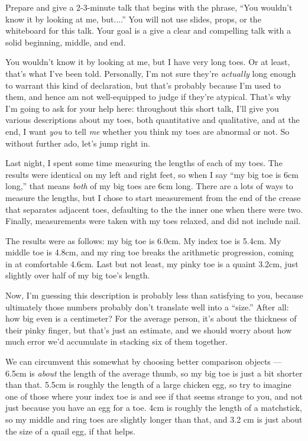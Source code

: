 \documentclass{fkpset}
\begin{document}
\begin{problem}[Prompt]
  Prepare and give a 2-3-minute talk that begins with the phrase, ``You wouldn't
  know it by looking at me, but....'' You will not use slides, props, or the
  whiteboard for this talk. Your goal is a give a clear and compelling talk with
  a solid beginning, middle, and end.
\end{problem}
\begin{solution}[Outline.]\setlength{\parindent}{1.5em}
  You wouldn't know it by looking at me, but I have very long toes. Or at least,
  that's what I've been told. Personally, I'm not sure they're \emph{actually}
  long enough to warrant this kind of declaration, but that's probably because
  I'm used to them, and hence am not well-equipped to judge if they're atypical.
  That's why I'm going to ask for your help here: throughout this short talk,
  I'll give you various descriptions about my toes, both quantitative and
  qualitative, and at the end, I want \emph{you} to tell \emph{me} whether
  you think my toes are abnormal or not. So without further ado, let's jump
  right in.

  Last night, I spent some time measuring the lengths of each of my toes. The
  results were identical on my left and right feet, so when I say ``my big toe
  is 6\si{cm} long,'' that means \emph{both} of my big toes are 6\si{cm} long.
  There are a lots of ways to measure the lengths, but I chose to start
  measurement from the end of the crease that separates adjacent toes,
  defaulting to the the inner one when there were two. Finally, measurements
  were taken with my toes relaxed, and did not include nail.

  The results were as follows: my big toe is 6.0\si{cm}. My index toe is
  5.4\si{cm}. My middle toe is 4.8\si{cm}, and my ring toe breaks the arithmetic
  progression, coming in at comfortable 4.6\si{cm}. Last but not least, my pinky
  toe is a quaint 3.2\si{cm}, just slightly over half of my big toe's length.

  Now, I'm guessing this description is probably less than satisfying to you,
  because ultimately those numbers probably don't translate well into a
  ``size.'' After all: how big even is a centimeter? For the average person,
  it's about the thickness of their pinky finger, but that's just an estimate,
  and we should worry about how much error we'd accumulate in stacking six of
  them together.

  We can circumvent this somewhat by choosing better comparison objects ---
  6.5\si{cm} is \emph{about} the length of the average thumb, so my big toe is
  just a bit shorter than that. 5.5\si{cm} is roughly the length of a large
  chicken egg, so try to imagine one of those where your index toe is and see if
  that seems strange to you, and not just because you have an egg for a toe.
  4\si{cm} is roughly the length of a matchstick, so my middle and ring toes are
  slightly longer than that, and 3.2 \si{cm} is just about the size of a quail
  egg, if that helps.


\end{solution}
\end{document}
